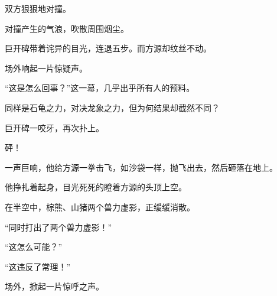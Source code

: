 \begin{this_body}
双方狠狠地对撞。

对撞产生的气浪，吹散周围烟尘。

巨开碑带着诧异的目光，连退五步。而方源却纹丝不动。

场外响起一片惊疑声。

“这是怎么回事？”这一幕，几乎出乎所有人的预料。

同样是石龟之力，对决龙象之力，但为何结果却截然不同？

巨开碑一咬牙，再次扑上。

砰！

一声巨响，他给方源一拳击飞，如沙袋一样，抛飞出去，然后砸落在地上。

他挣扎着起身，目光死死的瞪着方源的头顶上空。

在半空中，棕熊、山猪两个兽力虚影，正缓缓消散。

“同时打出了两个兽力虚影！”

“这怎么可能？”

“这违反了常理！”

场外，掀起一片惊呼之声。

\end{this_body}

